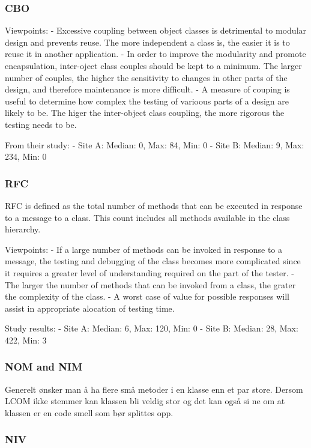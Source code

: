\subsubsection{CBO}

Viewpoints:
- Excessive coupling between object classes is detrimental to modular design and prevents reuse. The more independent a class is, the easier it is to reuse it in another application.
- In order to improve the modularity and promote encapsulation, inter-oject class couples should be kept to a minimum. The larger number of couples, the higher the sensitivity to changes in other parts of the design, and therefore maintenance is more difficult.
- A measure of couping is useful to determine how complex the testing of varioous parts of a design are likely to be. The higer the inter-object class coupling, the more rigorous the testing needs to be.

From their study:
- Site A: Median: 0, Max: 84, Min: 0
- Site B: Median: 9, Max: 234, Min: 0

\subsubsection{RFC}
RFC is defined as the total number of methods that can be executed in response to a message to a class. This count includes all methods available in the class hierarchy. 

Viewpoints:
- If a large number of methods can be invoked in response to a message, the testing and debugging of the class becomes more complicated since it requires a greater level of understanding required on the part of the tester. 
- The larger the number of methods that can be invoked from a class, the grater the complexity of the class.
- A worst case of value for possible responses will assist in appropriate alocation of testing time.

Study results:
- Site A: Median: 6, Max: 120, Min: 0
- Site B: Median: 28, Max: 422, Min: 3

\subsubsection{NOM and NIM}
Generelt ønsker man å ha flere små metoder i en klasse enn et par store. Dersom LCOM ikke stemmer kan klassen bli veldig stor og det kan også si ne om at klassen er en code smell som bør splittes opp.

\subsubsection{NIV}

